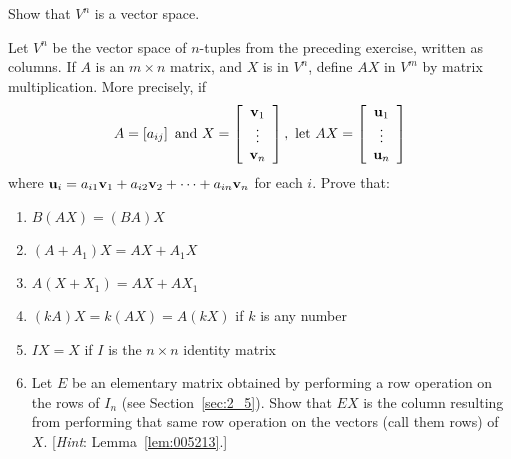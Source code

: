 \begin{multicols}{2}
\begin{ex}
Show that $V^{n}$ is a vector space.
\end{ex}

\begin{ex}\label{ex:6_1_18}
Let $V^{n}$ be the vector space of $n$-tuples from the preceding exercise, written as columns. If $A$ is an $m \times n$ matrix, and $X$ is in $V^{n}$, define $AX$ in $V^{m}$ by matrix multiplication. More precisely, if
\begin{equation*}
A = \left[ a_{ij} \right] \mbox{ and } X = 
\left[ \begin{array}{c}
\textbf{v}_1 \\
\vdots \\
\textbf{v}_n
\end{array} \right], \mbox{ let } AX = 
\left[ \begin{array}{c}
\textbf{u}_1 \\
\vdots \\
\textbf{u}_n
\end{array} \right]
\end{equation*}
where $\textbf{u}_{i} = a_{i1}\textbf{v}_{1} + a_{i2}\textbf{v}_{2} + \dots + a_{in}\textbf{v}_{n}$ for each $i$. \newline Prove that:

\begin{enumerate}[label={\alph*.}]
\item $B(AX) = (BA)X$

\item $(A + A_{1})X = AX + A_{1}X$

\item $A(X + X_{1}) = AX + AX_{1}$

\item $(kA)X = k(AX) = A(kX)$ if $k$ is any number

\item $IX = X$ if $I$ is the $n \times n$ identity matrix

\item Let $E$ be an elementary matrix obtained by performing a row operation on the rows of $I_{n}$ (see Section~\ref{sec:2_5}). Show that $EX$ is the column resulting from performing that same row operation on the vectors (call them rows) of $X$. [\textit{Hint}: Lemma~\ref{lem:005213}.]

\end{enumerate}
\end{ex}
\end{multicols}
